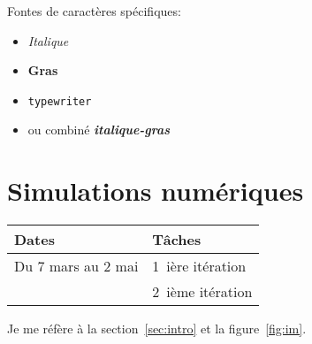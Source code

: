\documentclass{article}
\begin{document}
Fontes de caractères spécifiques:
\begin{itemize}
\item \emph{Italique}
\item \textbf{Gras}
\item \texttt{typewriter}
\item ou combiné \emph{\textbf{italique-gras}}
\end{itemize}

\section{Simulations numériques}

\begin{tabular}[h]{|l|l|}
\hline
Dates              & Tâches  \\
\hline
\hline
Du 7 mars au 2 mai & 1~ière itération \\
                   & 2~ième  itération \\
\hline
\end{tabular}
    
Je me réfère à la section~\ref{sec:intro} et la figure~\ref{fig:im}.



\end{document}
